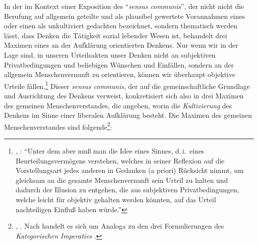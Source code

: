 In der  im Kontext einer
Exposition des \enquote{\emph{sensus communis}}, der nicht nicht die
Berufung auf allgemein geteilte und als plausibel gewertete Vorannahmen eines
 oder einen als unkultiviert gedachten  bezeichnet, sondern thematisch werden lässt, dass Denken die
Tätigkeit sozial lebender Wesen ist, behandelt  drei
Maximen eines an der Aufklärung orientierten Denkens.
Nur wenn wir in der Lage sind, in unseren Urteilsakten unser Denken nicht an
subjektiven Privatbedingungen und beliebigen Wünschen und Einfällen, sondern an
der allgemein Menschenvernunft zu orientieren, können wir überhaupt objektive
Urteile fällen.\footnote{\cite[Vgl.][\S~40]{Kant:KritikderUrteilskraft2009}, \cite[][V:
293.30--36]{Kant:GesammelteWerke1900ff.}: \enquote{Unter dem  aber muß man die Idee eines  Sinnes, d.\,i.\
eines Beurteilungsvermögens verstehen, welches in seiner Reflexion auf die
Vorstellungsart jedes anderen in Gedanken (a priori) Rücksicht nimmt, um
gleichsam an die gesamte Menschenvernunft sein Urteil zu halten und dadurch der
Illusion zu entgehen, die aus subjektiven Privatbedingungen, welche leicht für
objektiv gehalten werden könnten, auf das Urteil nachteiligen Einfluß haben
würde.}} Dieser \emph{sensus communis}, der auf die gemeinschaftliche Grundlage und
Ausrichtung des Denkens verweist, konkretisiert sich also in drei Maximen des
gemeinen Menschenverstandes, die angeben, worin die \emph{Kultivierung} des
Denkens im Sinne einer liberalen Aufklärung besteht. Die Maximen des gemeinen Menschenverstandes
sind folgende\footnote{\cite[Vgl.][\S~40]{Kant:KritikderUrteilskraft2009},
\cite[][V: 294.14--295.19]{Kant:GesammelteWerke1900ff.}. Nach
 handelt es sich um Analoga zu
den drei Formulierungen des \emph{Kategorischen Imperativs}
\parencite[vgl.][330]{Cohen:KantontheEthicsofBelief2014}.}:
